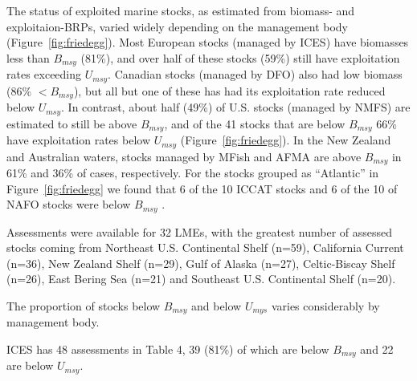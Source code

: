 The status of exploited marine stocks, as estimated from biomass- and
exploitaion-BRPs, varied widely depending on the management body
(Figure~\ref{fig:friedegg}). Most European stocks (managed by
ICES) have biomasses less than $B_{msy}$
(81\%), and over half of these
stocks (59\%) still
have exploitation rates exceeding $U_{msy}$. Canadian stocks (managed
by DFO) also had low biomass (86\%
$< B_{msy}$), but all but one of these has had its exploitation rate
reduced below $U_{msy}$. In contrast, about half
(49\%) of U.S. stocks (managed by
NMFS) are estimated to still be above $B_{msy}$, and of the
41 stocks that are below $B_{msy}$
66\% have exploitation
rates below $U_{msy}$ (Figure~\ref{fig:friedegg}). In the New
Zealand and Australian waters, stocks managed by MFish and AFMA are
above $B_{msy}$ in 61\% and
36\% of cases, respectively. For
the stocks grouped as ``Atlantic'' in Figure~\ref{fig:friedegg} we
found that 6 of the
10 ICCAT stocks and
6 of the
10 of NAFO stocks were below $B_{msy}$ .



Assessments were available for 32 LMEs, with the greatest number of
assessed stocks coming from Northeast U.S. Continental Shelf (n=59),
California Current (n=36), New Zealand Shelf (n=29),
Gulf of Alaska (n=27), Celtic-Biscay Shelf (n=26), East Bering Sea (n=21)
and Southeast U.S. Continental Shelf (n=20).

The proportion of stocks below $B_{msy}$ and below $U_{mys}$ varies considerably by management body. 

ICES has 48 assessments in Table 4,
39
(81\%) of which are below
$B_{msy}$ and 22 are below
$U_{msy}$.
